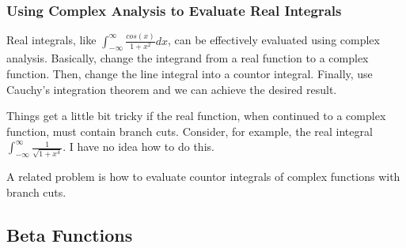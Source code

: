 \documentclass[12pt,oneside,reqno]{amsart}
\theoremstyle{definition}
\theoremstyle{remark}
\begin{document}
\subsubsection{Using Complex Analysis to Evaluate Real Integrals}
Real integrals, like $\int_{-\infty}^{\infty}\frac{cos(x)}{1+x^2}dx$, can be effectively evaluated using complex analysis. Basically, change the integrand from a real function to a complex function. Then, change the line integral into a countor integral. Finally, use Cauchy's integration theorem and we can achieve the desired result. 

Things get a little bit tricky if the real function, when continued to a complex function, must contain branch cuts. Consider, for example, the real integral $\int_{-\infty}^{\infty}\frac{1}{\sqrt{1+x^4}}$. I have no idea how to do this.

A related problem is how to evaluate countor integrals of complex functions with branch cuts.

\subsection{Beta Functions}
\end{document}
